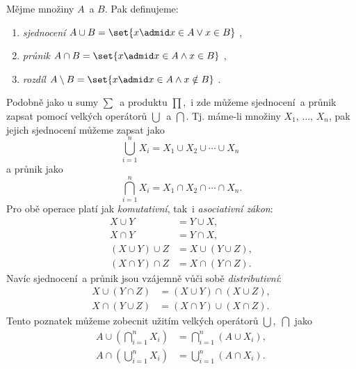 \begin{definition}\label{def:zakladni_mnozinove_operace}
    Mějme množiny $A$~a $B$. Pak definujeme:
    \begin{enumerate}[label=(\roman*)]
        \item \emph{sjednocení} $A \cup B=\set{x \admid x \in A \lor x \in B}$ ,
        \item \emph{průnik} $A \cap B=\set{x \admid x \in A \land x \in B}$ ,
        \item \emph{rozdíl} $A \setminus B=\set{x \admid x \in A \land x \notin B}$ .
    \end{enumerate}
\end{definition}

Podobně jako u sumy $\sum$~a produktu $\prod$,~i zde můžeme sjednocení~a průnik zapsat pomocí velkých operátorů $\bigcup$~a $\bigcap$. Tj. máme-li množiny $X_1,\,\dots,\,X_n$, pak jejich sjednocení můžeme zapsat jako
\begin{equation*}
    \bigcup\limits_{i=1}^{n}{X_i}=X_1 \cup X_2 \cup \cdots \cup X_n\;
\end{equation*}
a průnik jako
\begin{equation*}
    \bigcap\limits_{i=1}^{n}{X_i}=X_1 \cap X_2 \cap \cdots \cap X_n.
\end{equation*}
Pro obě operace platí jak \emph{komutativní}, tak~i \emph{asociativní zákon}:
\begin{align*}
    X \cup Y&=Y \cup X,\\
    X \cap Y&=Y \cap X,\\
    (X \cup Y) \cup Z &= X \cup (Y \cup Z),\\
    (X \cap Y) \cap Z &= X \cap (Y \cap Z).
\end{align*}
Navíc sjednocení~a průnik jsou vzájemně vůči sobě \emph{distributivní}:
\begin{align*}
    X \cup (Y \cap Z) &= (X \cup Y) \cap (X \cup Z),\\
    X \cap (Y \cup Z) &= (X \cap Y) \cup (X \cap Z).
\end{align*}
Tento poznatek můžeme zobecnit užitím velkých operátorů $\bigcup,\;\bigcap$ jako
\begin{align*}
    A \cup \left(\bigcap\limits_{i=1}^{n}{X_i}\right)&=\bigcap\limits_{i=1}^{n}{(A \cup X_i)},\\
    A \cap \left(\bigcup\limits_{i=1}^{n}{X_i}\right)&=\bigcup\limits_{i=1}^{n}{(A \cap X_i)}.
\end{align*}


